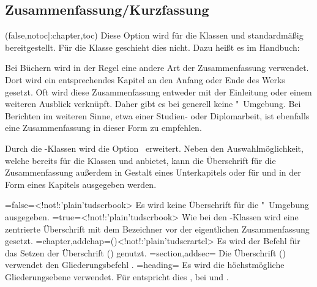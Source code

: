\begin{DeclareEntity*}{}
\begin{DeclareEntity*}{}
\begin{DeclareEntity*}{}
\subsection{%
  Zusammenfassung/Kurzfassung%
}
%
\begin{Declaration}
  {}
  (false,notoc|:chapter,toc)
Diese Option wird für die Klassen  und  
standardmäßig bereitgestellt. Für die Klasse  geschieht dies 
nicht. Dazu heißt es im Handbuch:
%
\begin{quoting}
Bei Büchern wird in der Regel eine andere Art der Zusammenfassung verwendet. 
Dort wird ein entsprechendes Kapitel an den Anfang oder Ende des Werks gesetzt. 
Oft wird diese Zusammenfassung entweder mit der Einleitung oder einem weiteren 
Ausblick verknüpft. Daher gibt es bei  generell keine 
"~Umgebung. Bei Berichten im weiteren Sinne, etwa einer 
Studien- oder Diplomarbeit, ist ebenfalls eine Zusammenfassung in dieser Form 
zu empfehlen.
\end{quoting}
%
Durch die \TUDScript-Klassen wird die Option~ erweitert. 
Neben den Auswahlmöglichkeit, welche bereits \KOMAScript für die Klassen 
 und  anbietet, kann die Überschrift für 
die Zusammenfassung außerdem in Gestalt eines Unterkapitels oder für 
 und  in der Form eines Kapitels 
ausgegeben werden.
\begin{DeclareValues}
\itemval=false=<!not!:\Class'plain'{tudscrbook}>
  Es wird keine Überschrift für die "~Umgebung ausgegeben.
\itemval*=true=<!not!:\Class'plain'{tudscrbook}>
  Wie bei den \KOMAScript-Klassen wird eine zentrierte Überschrift mit dem 
  Bezeichner  vor der eigentlichen Zusammenfassung gesetzt.
\itemval=chapter,addchap=()<!not!:\Class'plain'{tudscrartcl}>
  Es wird der Befehl  für das Setzen der Überschrift 
  () genutzt. 
\itemval=section,addsec=
  Die Überschrift () verwendet den Gliederungsbefehl 
  .
\itemval=heading=
  Es wird die höchstmögliche Gliederungsebene verwendet. Für 
   entspricht dies , bei 
   und  .
\end{DeclareValues}


\end{Declaration}
\end{DeclareEntity*}
\end{DeclareEntity*}
\end{DeclareEntity*}

